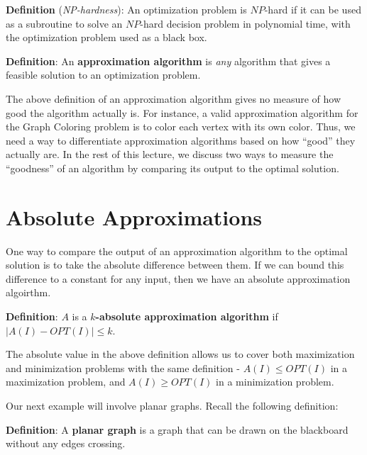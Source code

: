 \documentclass{article}
\begin{document}
\textbf{Definition}
(\emph{NP-hardness}):
An optimization
  problem is $NP$-hard if it can be used as a subroutine to solve an
  $NP$-hard decision problem in polynomial time, with the optimization
  problem used as a black box.

\textbf{Definition}:
An \textbf{approximation algorithm} is \textit{any}
  algorithm that gives a feasible solution to an optimization problem.

The above definition of an approximation algorithm gives no measure of how good the algorithm actually is.  For instance, a valid approximation algorithm for the Graph Coloring problem is to color each vertex with its own color.  Thus, we need a way to differentiate approximation algorithms based on how ``good'' they actually are. In the rest of this lecture, we discuss two ways to measure the ``goodness'' of an algorithm by comparing its output to the optimal solution.

\section{Absolute Approximations}

One way to compare the output of an approximation algorithm to the optimal solution is to take the absolute difference between them. If we can bound this difference to a constant for any input, then we have an absolute approximation algoirthm.

\textbf{Definition}:
  $A$ is a \textbf{{\boldmath$k$}-absolute
    approximation algorithm} if $|A(I) - OPT(I)| \le k$.

The absolute value in the above definition allows us to cover both
maximization and minimization problems with the same definition - $A(I) \le OPT(I)$ in a maximization problem, and $A(I)\ge OPT(I)$ in a
minimization problem.

Our next example will involve planar graphs.  Recall the following
definition:

\textbf{Definition}:
  A \textbf{planar graph} is a graph that can be
  drawn on the blackboard without any edges crossing.
\end{document}
